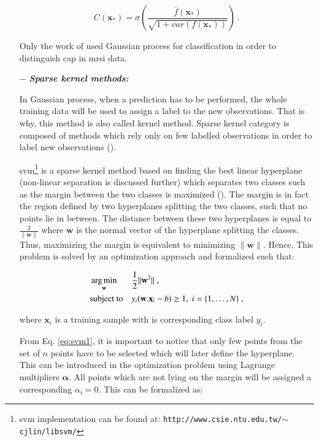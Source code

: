 \begin{enumerate}[leftmargin=*]
\begin{equation}
	C(\mathbf{x}_*) = \sigma\left( \frac{\bar{f}(\mathbf{x_*})}{\sqrt{1+var(f(\mathbf{x}_*))}} \right) \ .
	\label{eq:gp3}
\end{equation}

Only the work of \cite{Kelm2007} used Gaussian process for classification in order to distinguish \ac{cap} in \ac{mrsi} data.

\item[$-$] \textbf{\textit{Sparse kernel methods:}}

In Gaussian process, when a prediction has to be performed, the whole training data will be used to assign a label to the new observations. That is why, this method is also called kernel method. Sparse kernel category is composed of methods which rely only on few labelled observations in order to label new observations (\cite{Bishop2006}).

\Acf{svm}\footnote{\ac{svm} implementation can be found at: \texttt{http://www.csie.ntu.edu.tw/\allowbreak $\sim$cjlin/libsvm/}} is a sparse kernel method based on finding the best linear hyperplane (non-linear separation is discussed further) which separates two classes such as the margin between the two classes is maximized (\cite{Vapnik1963}). The margin is in fact the region defined by two hyperplanes splitting the two classes, such that no points lie in between. The distance between these two hyperplanes is equal to $\frac{2}{\|\mathbf{w}\|}$ where $\mathbf{w}$ is the normal vector of the hyperplane splitting the classes. Thus, maximizing the margin is equivalent to minimizing $\|\mathbf{w}\|$. Hence, This problem is solved by an optimization approach and formalized such that:

\begin{equation}
\begin{aligned}
& \operatorname*{arg\,min}_{\mathbf{w}}
& & \frac{1}{2} \| \mathbf{w}^2\| \ , \\
& \text{subject to}
& & y_i(\mathbf{w}.\mathbf{x}_i - b) \geq 1, \; i = \{ 1, \ldots, N \} \ ,
\end{aligned}
\label{eq:svm1}
\end{equation}

\noindent where $\mathbf{x}_i$ is a training sample with is corresponding class label $y_i$.

From Eq. \eqref{eq:svm1}, it is important to notice that only few points from the set of $n$ points have to be selected which will later define the hyperplane. This can be introduced in the optimization problem using Lagrange multipliers $\boldsymbol{\alpha}$. All points which are not lying on the margin will be assigned a corresponding $\alpha_i = 0$. This can be formalized as:


\end{enumerate}

